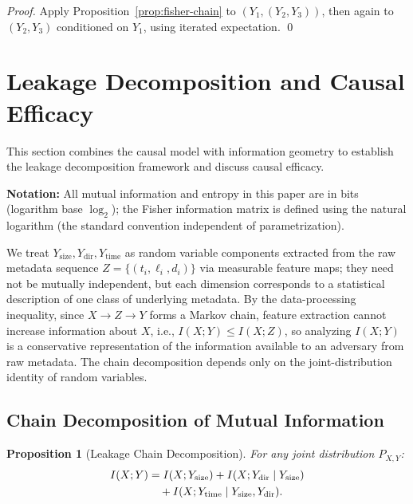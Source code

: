 \documentclass[lettersize,journal]{IEEEtran}
\newtheorem{proposition}{Proposition}
\begin{document}
\begin{proof}
Apply Proposition~\ref{prop:fisher-chain} to $(Y_1,(Y_2,Y_3))$, then again
to $(Y_2,Y_3)$ conditioned on $Y_1$, using iterated expectation. \qed
\end{proof}

\section{Leakage Decomposition and Causal Efficacy}\label{sec:leakage}

This section combines the causal model with information geometry to
establish the leakage decomposition framework and discuss causal efficacy.

\textbf{Notation:} All mutual information and entropy in this paper are in
bits (logarithm base $\log_2$); the Fisher information matrix is defined
using the natural logarithm (the standard convention independent of
parametrization).

We treat $Y_{\mathrm{size}}, Y_{\mathrm{dir}}, Y_{\mathrm{time}}$ as
random variable components extracted from the raw metadata sequence
$Z=\{(t_i,\ell_i,d_i)\}$ via measurable feature maps; they need not be
mutually independent, but each dimension corresponds to a statistical
description of one class of underlying metadata.
By the data-processing inequality, since $X\to Z\to Y$ forms a Markov
chain, feature extraction cannot increase information about $X$, i.e.,
$I(X;Y)\leq I(X;Z)$, so analyzing $I(X;Y)$ is a conservative
representation of the information available to an adversary from raw
metadata.
The chain decomposition depends only on the joint-distribution identity of
random variables.

\subsection{Chain Decomposition of Mutual Information}

\begin{proposition}[Leakage Chain Decomposition]\label{prop:chain-rule}
For any joint distribution $P_{X,Y}$:
\begin{align}\label{eq:chain-rule}
I(X;Y) &= I(X;Y_{\mathrm{size}}) + I(X;Y_{\mathrm{dir}}\mid Y_{\mathrm{size}})\notag\\
        &\quad + I(X;Y_{\mathrm{time}} \mid Y_{\mathrm{size}},Y_{\mathrm{dir}}).
\end{align}
\end{proposition}
\end{document}
